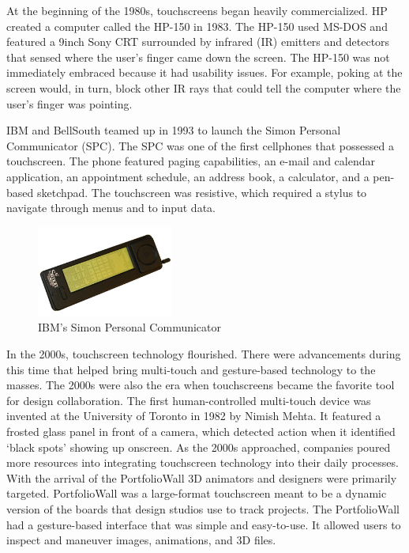 \documentclass{article}
\begin{document}
At the beginning of the 1980s, touchscreens began heavily commercialized. HP created a computer called the HP-150 in 1983. The HP-150 used MS-DOS and featured a 9inch Sony CRT surrounded by infrared (IR) emitters and detectors that sensed where the user's finger came down the screen. The HP-150 was not immediately embraced because it had usability issues. For example, poking at the screen would, in turn, block other IR rays that could tell the computer where the user's finger was pointing. 

IBM and BellSouth teamed up in 1993 to launch the Simon Personal Communicator (SPC). The SPC was one of the first cellphones that possessed a touchscreen. The phone featured paging capabilities, an e-mail and calendar application, an appointment schedule, an address book, a calculator, and a pen-based sketchpad. The touchscreen was resistive, which required a stylus to navigate through menus and to input data.
\cite{ref8}

\begin{figure}[!ht]
    \caption{IBM's Simon Personal Communicator}
    \label{image:SPC}
    \centering
    \includegraphics[width=0.4\textwidth]{pics/IBM_Simon.jpeg}
\end{figure}

In the 2000s, touchscreen technology flourished. There were advancements during this time that helped bring multi-touch and gesture-based technology to the masses. The 2000s were also the era when touchscreens became the favorite tool for design collaboration. The first human-controlled multi-touch device was invented at the University of Toronto in 1982 by Nimish Mehta. It featured a frosted glass panel in front of a camera, which detected action when it identified ‘black spots’ showing up onscreen.
As the 2000s approached, companies poured more resources into integrating touchscreen technology into their daily processes. With the arrival of the PortfolioWall 3D animators and designers were primarily targeted. PortfolioWall was a large-format touchscreen meant to be a dynamic version of the boards that design studios use to track projects.  The PortfolioWall had a gesture-based interface that was simple and easy-to-use. It allowed users to inspect and maneuver images, animations, and 3D files. 
\cite{ref8}
\end{document}
